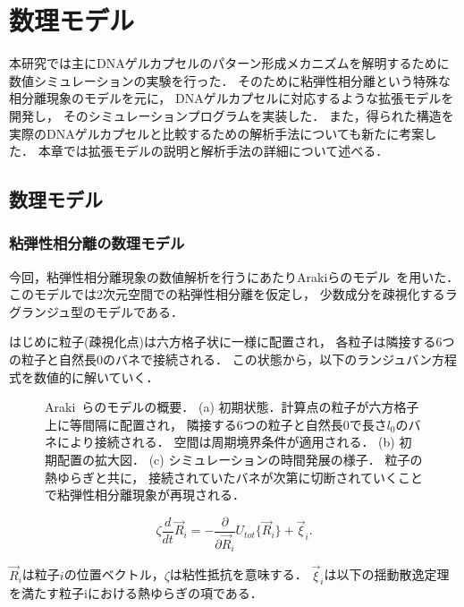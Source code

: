 \chapter{数理モデル}
\label{sec:model}

本研究では主にDNAゲルカプセルのパターン形成メカニズムを解明するために数値シミュレーションの実験を行った．
そのために粘弾性相分離という特殊な相分離現象のモデルを元に，
DNAゲルカプセルに対応するような拡張モデルを開発し，
そのシミュレーションプログラムを実装した．
また，得られた構造を実際のDNAゲルカプセルと比較するための解析手法についても新たに考案した．
本章では拡張モデルの説明と解析手法の詳細について述べる．

\section{数理モデル}

\subsection{粘弾性相分離の数理モデル}
今回，粘弾性相分離現象の数値解析を行うにあたりArakiらのモデル~\cite{araki2005simple}を用いた．
このモデルでは2次元空間での粘弾性相分離を仮定し，
少数成分を疎視化するラグランジュ型のモデルである．

はじめに粒子(疎視化点)は六方格子状に一様に配置され，
各粒子は隣接する6つの粒子と自然長$0$のバネで接続される．
この状態から，以下のランジュバン方程式を数値的に解いていく．


\begin{figure}
\centering

\caption{
    Araki~\cite{araki2005simple}らのモデルの概要．
    (a) 初期状態．計算点の粒子が六方格子上に等間隔に配置され，
        隣接する6つの粒子と自然長$0$で長さ$l_0$のバネにより接続される．
        空間は周期境界条件が適用される．
    (b) 初期配置の拡大図．
    (c) シミュレーションの時間発展の様子．
        粒子の熱ゆらぎと共に，
        接続されていたバネが次第に切断されていくことで粘弾性相分離現象が再現される．
}
\label{fig:model_2d}
\end{figure}


\begin{equation}
\label{eq:main}
\zeta
\frac{d}{dt}
\vec{R}_i
=
-\frac{\partial}{\partial\vec{R}_i}
U_{tot}\{\vec{R}_i\}
+\vec{\xi}_i
.
\end{equation}

$\vec{R}_i$は粒子$i$の位置ベクトル，$\zeta$は粘性抵抗を意味する．
$\vec{\xi}_i$は以下の揺動散逸定理を満たす粒子iにおける熱ゆらぎの項である．

